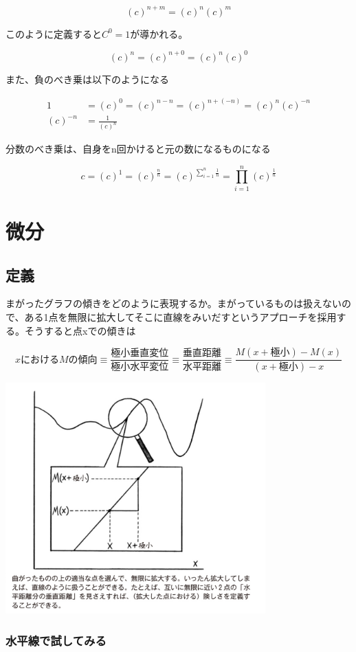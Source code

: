 \documentclass[dvipdfmx]{jsarticle}
\begin{document}
\[(c)^{n+m} = (c)^n(c)^m \]

このように定義すると$C^0 = 1$が導かれる。

\[ (c)^n = (c)^{n+0} = (c)^n(c)^0 \]

また、負のべき乗は以下のようになる

\begin{align*}
1 &= (c)^0 = (c)^{n-n} = (c)^{n+(-n)} = (c)^n(c)^{-n} \\
(c)^{-n} &= \frac{1}{(c)^n}
\end{align*}

分数のべき乗は、自身をn回かけると元の数になるものになる

\[ c = (c)^1 = (c)^{\frac{n}{n}} = (c)^{\sum_{i=1}^{n}\frac{1}{n}} = \prod_{i=1}^{n}(c)^{\frac{1}{n}} \]

\section{微分}

\subsection{定義}
まがったグラフの傾きをどのように表現するか。まがっているものは扱えないので、ある1点を無限に拡大してそこに直線をみいだすというアプローチを採用する。そうすると点xでの傾きは

\[ xにおけるMの傾向 \equiv \frac{極小垂直変位}{極小水平変位} \equiv \frac{垂直距離}{水平距離} \equiv \frac{M(x+極小) - M(x)}{(x + 極小) -x } \]

  \includegraphics[width=10cm]{images/burn_math_2-1.png}

\subsubsection{水平線で試してみる}
\end{document}
